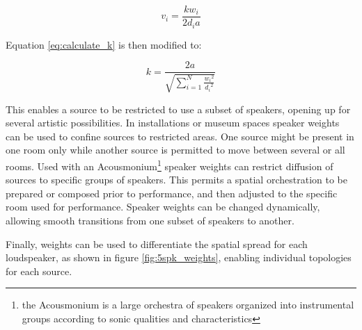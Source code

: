 \documentclass[twoside,10pt]{article}
\begin{document}
\begin{equation} \label{eq:inverse_distance_weighed}
v_{i} = \frac{k w_{i}}{2 d_{i} a} 
\end{equation}

Equation \ref{eq:calculate_k} is then modified to:

\begin{equation} \label{eq:calculate_k_weighted}
k = \frac{2a}{\sqrt{\sum_{i=1}^{N} \frac{{w_{i}}^2}{{d_{i}}^2}}}
\end{equation}

This enables a source to be restricted to use a subset of speakers, opening up for several artistic possibilities. In installations or museum spaces speaker weights can be used to confine sources to restricted areas. One source might be present in one room only while another source is permitted to move between several or all rooms. Used with an Acousmonium\footnote{the Acousmonium is a large orchestra of speakers organized into instrumental groups according to sonic qualities and characteristics} \cite{Bayle:1993MusiqueAcousmatique} speaker weights can restrict diffusion of sources to specific groups of speakers. This permits a spatial orchestration to be prepared or composed prior to performance, and then adjusted to the specific room used for performance.  Speaker weights can be changed dynamically, allowing smooth transitions from one subset of speakers to another.

Finally, weights can be used to differentiate the spatial spread for each loudspeaker, as shown in figure \ref{fig:5spk_weights}, enabling individual topologies for each source.





%
%
\end{document}
